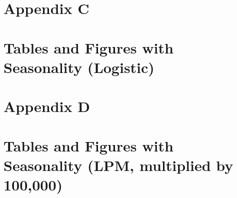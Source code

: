 \vfill
\eject












\clearpage
\pagebreak

\section*{Appendix C}
\vspace{3.0in}

\section*{Tables and Figures with Seasonality (Logistic)}
\label{sec:Appendix}

\vfill
\eject










\clearpage
\pagebreak

\section*{Appendix D}
\vspace{3.0in}

\section*{Tables and Figures with Seasonality (LPM, multiplied by 100,000)}
\label{sec:Appendix}

\vfill
\eject











